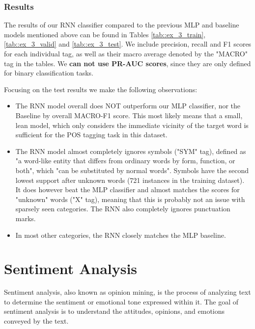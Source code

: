 \documentclass[10pt, a4paper]{article}
\begin{document}
	\subsubsection{Results}
	
	The results of our RNN classifier compared to the previous MLP and baseline models mentioned above can be found in Tables \ref{tab::ex_3_train}, \ref{tab::ex_3_valid} and \ref{tab::ex_3_test}. We include precision, recall and F1 scores for each individual tag, as well as their macro average denoted by the "MACRO" tag in the tables. We \textbf{can not use PR-AUC scores}, since they are only defined for binary classification tasks.
	
	Focusing on the test results we make the following observations:
	\begin{itemize}
		\item The RNN model overall does NOT outperform our MLP classifier, nor the Baseline by overall MACRO-F1 score. This most likely means that a small, lean model, which only considers the immediate vicinity of the target word is sufficient for the POS tagging task in this dataset.
		
		\item The RNN model almost completely ignores symbols ("SYM" tag), defined as "a word-like entity that differs from ordinary words by form, function, or both", which "can be substituted by normal words". Symbols have the second lowest support after unknown words (721 instances in the training dataset). It does however beat the MLP classifier and almost matches the scores for "unknown" words ("X" tag), meaning that this is probably not an issue with sparsely seen categories. The RNN also completely ignores punctuation marks.
		
		\item In most other categories, the RNN closely matches the MLP baseline.
		
	\end{itemize}
	
	
	
	
	
	
	
	
	\section{Sentiment Analysis}
	
	Sentiment analysis, also known as opinion mining, is the process of analyzing text to determine the sentiment or emotional tone expressed within it. The goal of sentiment analysis is to understand the attitudes, opinions, and emotions conveyed by the text. 
	
\end{document}

